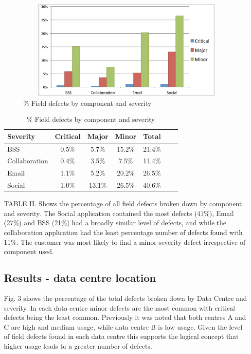 \begin{figure}
\begin{center}
\includegraphics[height=5cm, width=14cm]{graphs/social_test/graph2.pdf} 
\caption{\% Field defects by component and severity}
\end{center}
\label{fig:defectcomp}
\end{figure}


\begin {table}[]
\caption {}
\caption {\% Field defects by component and severity} 
\begin{center}
\begin{tabular}{l*{5}{c}r} Severity & Critical & Major & Minor &  Total \\ \hline BSS & 0.5\%	& 5.7\% & 15.2\% & 21.4\% \\ Collaboration &	0.4\% & 3.5\% & 7.5\% & 11.4\% \\ Email	& 1.1\% & 5.2\% & 20.2\%	 & 26.5\%  \\  Social	& 1.0\% & 13.1\% & 26.5\% & 40.6\% \end{tabular}
\end{center}
\end{table}


TABLE II. Shows the percentage of all field defects broken down by component and severity. The Social application contained the most defects (41\%), Email (27\%) and BSS (21\%) had a broadly similar level of defects, and while the collaboration application had the least percentage number of defects found with 11\%.  The customer was most likely to find a minor severity defect irrespective of component used.

\subsection{Results - data centre location}

Fig. 3 shows the percentage of the total defects broken down by Data Centre and severity. In each data centre minor defects are the most common with critical defects being the least common. Previously it was noted that both centres A and C are high and medium usage, while data centre B is low usage. Given the level of field defects found in each data centre this supports the logical concept that higher usage leads to a greater number of defects.

